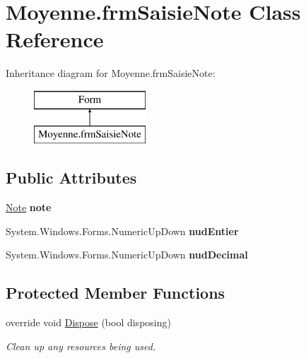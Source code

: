 \hypertarget{class_moyenne_1_1frm_saisie_note}{}\section{Moyenne.\+frm\+Saisie\+Note Class Reference}
\label{class_moyenne_1_1frm_saisie_note}
Inheritance diagram for Moyenne.\+frm\+Saisie\+Note\+:\begin{figure}[H]
\begin{center}
\leavevmode
\includegraphics[height=2.000000cm]{class_moyenne_1_1frm_saisie_note}
\end{center}
\end{figure}
\subsection*{Public Attributes}
\begin{DoxyCompactItemize}
\item 
\mbox{\label{class_moyenne_1_1frm_saisie_note_a2ae44fbf3eb13e3c2be910451a1660e2}} 
\hyperlink{class_moyenne_1_1_note}{Note} {\bfseries note}
\item 
\mbox{\label{class_moyenne_1_1frm_saisie_note_aa9943d0221bf23b31dee4c84af92583b}} 
System.\+Windows.\+Forms.\+Numeric\+Up\+Down {\bfseries nud\+Entier}
\item 
\mbox{\label{class_moyenne_1_1frm_saisie_note_a5e7a2d1caafffe863cd6aae2c968f3b5}} 
System.\+Windows.\+Forms.\+Numeric\+Up\+Down {\bfseries nud\+Decimal}
\end{DoxyCompactItemize}
\subsection*{Protected Member Functions}
\begin{DoxyCompactItemize}
\item 
override void \hyperlink{class_moyenne_1_1frm_saisie_note_a3368c473ed5efe48547f79ebff70a0f5}{Dispose} (bool disposing)
\begin{DoxyCompactList}\small\item\em Clean up any resources being used. \end{DoxyCompactList}\end{DoxyCompactItemize}


